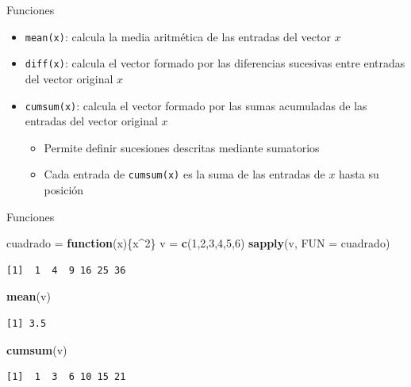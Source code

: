 \documentclass[
  ignorenonframetext,
]{beamer}
\newenvironment{Shaded}{\begin{snugshade}}{\end{snugshade}}
\newcommand{\AttributeTok}[1]{\textcolor[rgb]{0.13,0.29,0.53}{#1}}
\newcommand{\ControlFlowTok}[1]{\textcolor[rgb]{0.13,0.29,0.53}{\textbf{#1}}}
\newcommand{\DecValTok}[1]{\textcolor[rgb]{0.00,0.00,0.81}{#1}}
\newcommand{\FunctionTok}[1]{\textcolor[rgb]{0.13,0.29,0.53}{\textbf{#1}}}
\newcommand{\NormalTok}[1]{#1}
\newcommand{\OtherTok}[1]{\textcolor[rgb]{0.56,0.35,0.01}{#1}}
\newcommand{\SpecialCharTok}[1]{\textcolor[rgb]{0.81,0.36,0.00}{\textbf{#1}}}
\providecommand{\tightlist}{%
  \setlength{\itemsep}{0pt}\setlength{\parskip}{0pt}}
\begin{document}
\begin{frame}[fragile]{Funciones}
\label{funciones-2}
\begin{itemize}
\tightlist
\item
  \texttt{mean(x)}: calcula la media aritmética de las entradas del
  vector \(x\)
\item
  \texttt{diff(x)}: calcula el vector formado por las diferencias
  sucesivas entre entradas del vector original \(x\)
\item
  \texttt{cumsum(x)}: calcula el vector formado por las sumas acumuladas
  de las entradas del vector original \(x\)

  \begin{itemize}
  \tightlist
  \item
    Permite definir sucesiones descritas mediante sumatorios
  \item
    Cada entrada de \texttt{cumsum(x)} es la suma de las entradas de
    \(x\) hasta su posición
  \end{itemize}
\end{itemize}
\end{frame}

\begin{frame}[fragile]{Funciones}
\label{funciones-3}
\begin{Shaded}
\begin{Highlighting}[]
\NormalTok{cuadrado }\OtherTok{=} \ControlFlowTok{function}\NormalTok{(x)\{x}\SpecialCharTok{\^{}}\DecValTok{2}\NormalTok{\}}
\NormalTok{v }\OtherTok{=} \FunctionTok{c}\NormalTok{(}\DecValTok{1}\NormalTok{,}\DecValTok{2}\NormalTok{,}\DecValTok{3}\NormalTok{,}\DecValTok{4}\NormalTok{,}\DecValTok{5}\NormalTok{,}\DecValTok{6}\NormalTok{)}
\FunctionTok{sapply}\NormalTok{(v, }\AttributeTok{FUN =}\NormalTok{ cuadrado)}
\end{Highlighting}
\end{Shaded}

\begin{verbatim}
[1]  1  4  9 16 25 36
\end{verbatim}

\begin{Shaded}
\begin{Highlighting}[]
\FunctionTok{mean}\NormalTok{(v)}
\end{Highlighting}
\end{Shaded}

\begin{verbatim}
[1] 3.5
\end{verbatim}

\begin{Shaded}
\begin{Highlighting}[]
\FunctionTok{cumsum}\NormalTok{(v)}
\end{Highlighting}
\end{Shaded}

\begin{verbatim}
[1]  1  3  6 10 15 21
\end{verbatim}
\end{frame}
\end{document}
